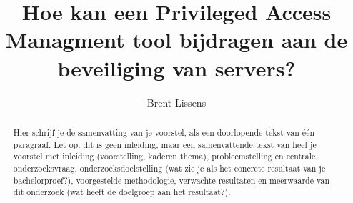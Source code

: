 \documentclass{hogent-article}
\title{Hoe kan een Privileged Access Managment tool bijdragen aan de beveiliging van servers?}
\author{Brent Lissens}
\begin{document}
\begin{abstract}
  Hier schrijf je de samenvatting van je voorstel, als een doorlopende tekst van één paragraaf. Let op: dit is geen inleiding, maar een samenvattende tekst van heel je voorstel met inleiding (voorstelling, kaderen thema), probleemstelling en centrale onderzoeksvraag, onderzoeksdoelstelling (wat zie je als het concrete resultaat van je bachelorproef?), voorgestelde methodologie, verwachte resultaten en meerwaarde van dit onderzoek (wat heeft de doelgroep aan het resultaat?).
\end{abstract}

\tableofcontents



\printbibliography[heading=bibintoc]
\end{document}
